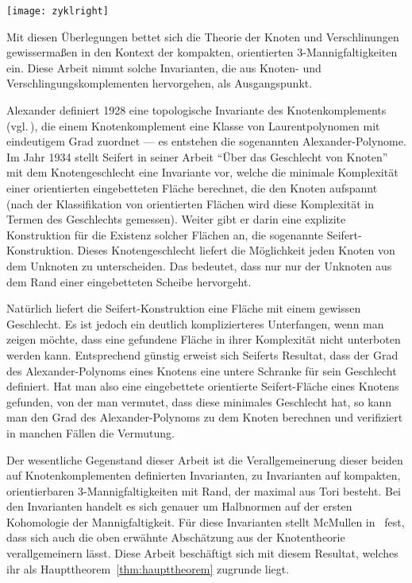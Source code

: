 	\hfill
	\begin{minipage}[t]{0.2\textwidth}
	\vfill \begin{flushright}
		\texttt{[image: zyklright]} 
	\end{flushright}
	\end{minipage}

	Mit diesen Überlegungen bettet sich die Theorie der Knoten und Verschlinungen gewissermaßen in den Kontext der kompakten, orientierten 3-Mannigfaltigkeiten ein. Diese Arbeit nimmt solche Invarianten, die aus Knoten- und Verschlingungskomplementen hervorgehen, als Ausgangspunkt.

	Alexander definiert 1928 eine topologische Invariante des Knotenkomplements (vgl.\,\cite{Alexander.1928}), die einem Knotenkomplement eine Klasse von Laurentpolynomen mit eindeutigem Grad zuordnet --- es entstehen die sogenannten Alexander-Polynome. Im Jahr 1934 stellt Seifert in seiner Arbeit "`Über das Geschlecht von Knoten"'~\cite{Seifert.1934} mit dem Knotengeschlecht eine Invariante vor, welche die minimale Komplexität einer orientierten eingebetteten Fläche berechnet, die den Knoten aufspannt (nach der Klassifikation von orientierten Flächen wird diese Komplexität in Termen des Geschlechts gemessen). Weiter gibt er darin eine explizite Konstruktion für die Existenz solcher Flächen an, die sogenannte Seifert-Konstruktion. Dieses Knotengeschlecht liefert die Möglichkeit jeden Knoten von dem Unknoten zu unterscheiden. Das bedeutet, dass nur nur der Unknoten aus dem Rand einer eingebetteten Scheibe hervorgeht. 

	Natürlich liefert die Seifert-Konstruktion eine Fläche mit einem gewissen Geschlecht. Es ist jedoch ein deutlich komplizierteres Unterfangen, wenn man zeigen möchte, dass eine gefundene Fläche in ihrer Komplexität nicht unterboten werden kann. Entsprechend günstig erweist sich Seiferts Resultat, dass der Grad des Alexander-Polynoms eines Knotens eine untere Schranke für sein Geschlecht definiert. Hat man also eine eingebettete orientierte Seifert-Fläche eines Knotens gefunden, von der man vermutet, dass diese minimales Geschlecht hat, so kann man den Grad des Alexander-Polynoms zu dem Knoten berechnen und verifiziert in manchen Fällen die Vermutung.

	Der wesentliche Gegenstand dieser Arbeit ist die Verallgemeinerung dieser beiden auf Knotenkomplementen definierten Invarianten, zu Invarianten auf kompakten, orientierbaren 3-Mannigfaltigkeiten mit Rand, der maximal aus Tori besteht. Bei den Invarianten handelt es sich genauer um Halbnormen auf der ersten Kohomologie der Mannigfaltigkeit. Für diese Invarianten stellt McMullen in~\cite{MCMULLEN.2002} fest, dass sich auch die oben erwähnte Abschätzung aus der Knotentheorie verallgemeinern lässt. Diese Arbeit beschäftigt sich mit diesem Resultat, welches ihr als Haupttheorem~\ref{thm:haupttheorem} zugrunde liegt.

